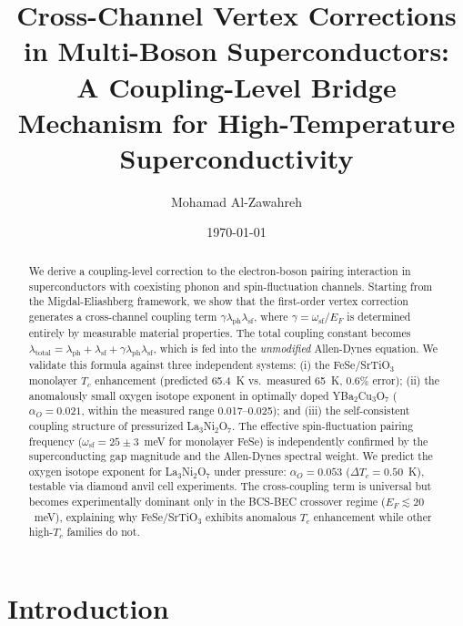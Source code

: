 \documentclass[twocolumn,showpacs,preprintnumbers,amsmath,amssymb,prb]{revtex4-2}
\begin{document}
\title{Cross-Channel Vertex Corrections in Multi-Boson Superconductors:\\
A Coupling-Level Bridge Mechanism for High-Temperature Superconductivity}

\author{Mohamad Al-Zawahreh}

\date{\today}

\begin{abstract}
We derive a coupling-level correction to the electron-boson pairing interaction in superconductors with coexisting phonon and spin-fluctuation channels.
Starting from the Migdal-Eliashberg framework, we show that the first-order vertex correction generates a cross-channel coupling term $\gamma \lambda_{\mathrm{ph}} \lambda_{\mathrm{sf}}$, where $\gamma = \omega_{\mathrm{sf}}/E_F$ is determined entirely by measurable material properties.
The total coupling constant becomes $\lambda_{\mathrm{total}} = \lambda_{\mathrm{ph}} + \lambda_{\mathrm{sf}} + \gamma \lambda_{\mathrm{ph}} \lambda_{\mathrm{sf}}$, which is fed into the \textit{unmodified} Allen-Dynes equation.
We validate this formula against three independent systems:
(i) the FeSe/SrTiO$_3$ monolayer $T_c$ enhancement (predicted 65.4~K vs.\ measured 65~K, 0.6\% error);
(ii) the anomalously small oxygen isotope exponent in optimally doped YBa$_2$Cu$_3$O$_7$ ($\alpha_O = 0.021$, within the measured range 0.017--0.025);
and (iii) the self-consistent coupling structure of pressurized La$_3$Ni$_2$O$_7$.
The effective spin-fluctuation pairing frequency ($\omega_{\mathrm{sf}} = 25 \pm 3$~meV for monolayer FeSe) is independently confirmed by the superconducting gap magnitude and the Allen-Dynes spectral weight.
We predict the oxygen isotope exponent for La$_3$Ni$_2$O$_7$ under pressure: $\alpha_O = 0.053$ ($\Delta T_c = 0.50$~K), testable via diamond anvil cell experiments.
The cross-coupling term is universal but becomes experimentally dominant only in the BCS-BEC crossover regime ($E_F \lesssim 20$~meV), explaining why FeSe/SrTiO$_3$ exhibits anomalous $T_c$ enhancement while other high-$T_c$ families do not.
\end{abstract}

\maketitle

\section{Introduction}
\end{document}
